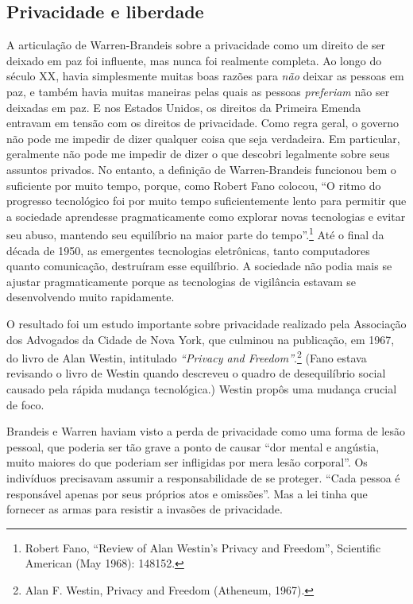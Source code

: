 \documentclass{book}
\newcommand{\ingles}[1]{\textit{#1}}
\begin{document}
\subsection{Privacidade e liberdade}
\label{cap3:quem-que-privacidade}

A articulação de Warren-Brandeis sobre a privacidade como um direito de ser
deixado em paz foi influente, mas nunca foi realmente completa. Ao longo do
século XX, havia simplesmente muitas boas razões para \emph{não} deixar as
pessoas em paz, e também havia muitas maneiras pelas quais as pessoas
\emph{preferiam} não ser deixadas em paz. E nos Estados Unidos, os direitos da
Primeira Emenda entravam em tensão com os direitos de privacidade. Como regra
geral, o governo não pode me impedir de dizer qualquer coisa que seja
verdadeira. Em particular, geralmente não pode me impedir de dizer o que
descobri legalmente sobre seus assuntos privados. No entanto, a definição de
Warren-Brandeis funcionou bem o suficiente por muito tempo, porque, como Robert
Fano colocou, ``O ritmo do progresso tecnológico foi por muito tempo
suficientemente lento para permitir que a sociedade aprendesse pragmaticamente
como explorar novas tecnologias e evitar seu abuso, mantendo seu equilíbrio na
maior parte do tempo''.\footnote{Robert Fano, ``Review of Alan Westin's Privacy
and Freedom'', Scientific American (May 1968): 148152.} Até o final da década
de 1950, as emergentes tecnologias eletrônicas, tanto computadores quanto
comunicação, destruíram esse equilíbrio. A sociedade não podia mais se ajustar
pragmaticamente porque as tecnologias de vigilância estavam se desenvolvendo
muito rapidamente.

O resultado foi um estudo importante sobre privacidade realizado pela
Associação dos Advogados da Cidade de Nova York, que culminou na publicação, em
1967, do livro de Alan Westin, intitulado \ingles{``Privacy and
Freedom''}.\footnote{ Alan F. Westin, Privacy and Freedom (Atheneum, 1967).}
(Fano estava revisando o livro de Westin quando descreveu o quadro de
desequilíbrio social causado pela rápida mudança tecnológica.) Westin propôs
uma mudança crucial de foco.

Brandeis e Warren haviam visto a perda de privacidade como uma forma de lesão
pessoal, que poderia ser tão grave a ponto de causar ``dor mental e angústia,
muito maiores do que poderiam ser infligidas por mera lesão corporal''. Os
indivíduos precisavam assumir a responsabilidade de se proteger. ``Cada pessoa
é responsável apenas por seus próprios atos e omissões''. Mas a lei tinha que
fornecer as armas para resistir a invasões de privacidade.
\end{document}
